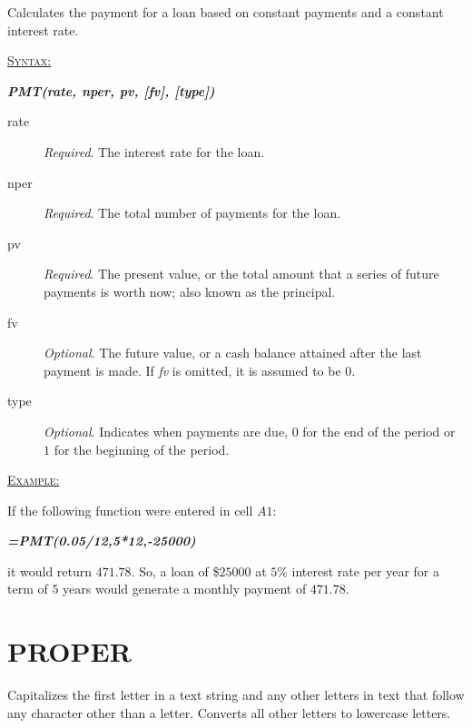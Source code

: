 Calculates the payment for a loan based on constant payments and a constant interest rate.

\begin{addmargin}[1cm]{0cm}
	
	\medskip
	\underline{\textsc{Syntax:}}
	\medskip
	
	{\color{Syntax}
		\noindent\textit{\textbf{PMT(rate, nper, pv, [fv], [type])}}
	}
	
	\begin{description}
		\item[rate] \textit{Required}. The interest rate for the loan.
		\item[nper] \textit{Required}. The total number of payments for the loan.
		\item[pv] \textit{Required}. The present value, or the total amount that a series of future payments is worth now; also known as the principal.
		\item[fv] \textit{Optional}. The future value, or a cash balance attained after the last payment is made. If \textit{fv} is omitted, it is assumed to be $ 0 $.  
		\item[type] \textit{Optional}. Indicates when payments are due, $ 0 $ for the end of the period or $ 1 $ for the beginning of the period.
	\end{description}

	\medskip
	\noindent\underline{\textsc{Example:}}
	\medskip
	
	\noindent If the following function were entered in cell $ A1 $:
	
	{\color{Syntax}
		\textit{\textbf{=PMT(0.05/12,5*12,-25000)}}
	}
	
	\noindent it would return $ 471.78 $. So, a loan of \$$ 25000 $ at $ 5 $\% interest rate per year for a term of $ 5 $ years would generate a monthly payment of $ 471.78 $.

\end{addmargin}

\section{PROPER}

Capitalizes the first letter in a text string and any other letters in text that follow any character other than a letter. Converts all other letters to lowercase letters.

